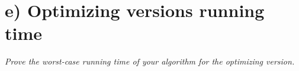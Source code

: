 
\section{e) Optimizing versions running time}

\textit{Prove the worst-case running time of your algorithm for the optimizing version.}

